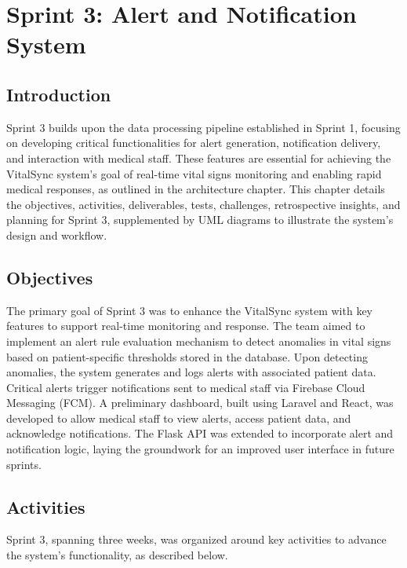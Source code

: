 \chapter{Sprint 3: Alert and Notification System}
\label{chap:sprint3}

\section*{Introduction}
Sprint 3 builds upon the data processing pipeline established in Sprint 1, focusing on developing critical functionalities for alert generation, notification delivery, and interaction with medical staff. These features are essential for achieving the VitalSync system's goal of real-time vital signs monitoring and enabling rapid medical responses, as outlined in the architecture chapter. This chapter details the objectives, activities, deliverables, tests, challenges, retrospective insights, and planning for Sprint 3, supplemented by UML diagrams to illustrate the system's design and workflow.

\section{Objectives}
The primary goal of Sprint 3 was to enhance the VitalSync system with key features to support real-time monitoring and response. The team aimed to implement an alert rule evaluation mechanism to detect anomalies in vital signs based on patient-specific thresholds stored in the database. Upon detecting anomalies, the system generates and logs alerts with associated patient data. Critical alerts trigger notifications sent to medical staff via Firebase Cloud Messaging (FCM). A preliminary dashboard, built using Laravel and React, was developed to allow medical staff to view alerts, access patient data, and acknowledge notifications. The Flask API was extended to incorporate alert and notification logic, laying the groundwork for an improved user interface in future sprints.

\section{Activities}
Sprint 3, spanning three weeks, was organized around key activities to advance the system's functionality, as described below.

